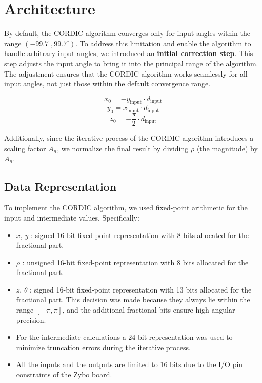 \chapter{Architecture}


By default, the CORDIC algorithm converges only for input angles within the range \( (-99.7^\circ, 99.7^\circ) \).
To address this limitation and enable the algorithm to handle arbitrary input angles, we introduced an \textbf{initial correction step}. This step adjusts the input angle to bring it into the principal range of the algorithm. The adjustment ensures that the CORDIC algorithm works seamlessly for all input angles, not just those within the default convergence range.

\[
    x_0 = -y_{\text{input}} \cdot d_{\text{input}}
\]
\[
    y_0 =  x_{\text{input}} \cdot d_{\text{input}}
\]
\[
    z_0 = -\frac{\pi}{2} \cdot d_{\text{input}}
\]

Additionally, since the iterative process of the CORDIC algorithm introduces a scaling factor \( A_n \), we normalize the final result by dividing \( \rho \) (the magnitude) by \( A_n \).

\section{Data Representation}

To implement the CORDIC algorithm, we used fixed-point arithmetic for the input and intermediate values. Specifically:

\begin{itemize}
    \item \( x \), \( y \) : signed 16-bit fixed-point representation with 8 bits allocated for the fractional part.
    \item \( \rho \) : unsigned 16-bit fixed-point representation with 8 bits allocated for the fractional part.
    \item \( z \), \( \theta \) : signed 16-bit fixed-point representation with 13 bits allocated for the fractional part. This decision was made because they always lie within the range \( [-\pi, \pi] \), and the additional fractional bits ensure high angular precision.
    \item For the intermediate calculations a 24-bit representation was used to minimize truncation errors during the iterative process. 
    \item All the inputs and the outputs are limited to 16 bits due to the I/O pin constraints of the Zybo board.
\end{itemize}

